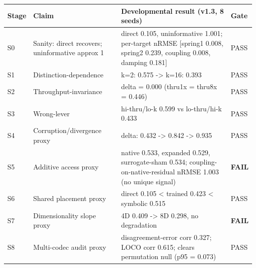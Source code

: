 \documentclass[
  11pt,
]{article}
\newcounter{none} %
\begin{document}
{\def\LTcaptype{none} %
\begin{longtable}[]{@{}
  >{\raggedright\arraybackslash}p{}
  >{\raggedright\arraybackslash}p{}
  >{\raggedright\arraybackslash}p{}
  >{\raggedright\arraybackslash}p{}@{}}
\toprule\noalign{}
\begin{minipage}[b]{\linewidth}\raggedright
Stage
\end{minipage} &
\begin{minipage}[b]{\linewidth}\raggedright
Claim
\end{minipage} &
\begin{minipage}[b]{\linewidth}\raggedright
Developmental result (v1.3, 8 seeds)
\end{minipage} &
\begin{minipage}[b]{\linewidth}\raggedright
Gate
\end{minipage} \\
\midrule\noalign{}
\endhead
\bottomrule\noalign{}
\endlastfoot
S0 & Sanity: direct recovers; uninformative approx 1 &
direct 0.105, uninformative 1.001; per-target nRMSE
{[}spring1 0.008, spring2 0.239, coupling 0.008,
damping 0.181{]} & PASS \\
S1 & Distinction-dependence & k=2: 0.575
-\textgreater{} k=16: 0.393 & PASS \\
S2 & Throughput-invariance & delta = 0.000 (thru1x =
thru8x = 0.446) & PASS \\
S3 & Wrong-lever & hi-thru/lo-k 0.599 vs lo-thru/hi-k
0.433 & PASS \\
S4 & Corruption/divergence proxy & delta: 0.432
-\textgreater{} 0.842 -\textgreater{} 0.935 & PASS \\
S5 & Additive access proxy & native 0.533, expanded
0.529, surrogate-sham 0.534;
coupling-on-native-residual nRMSE 1.003 (no unique
signal) & \textbf{FAIL} \\
S6 & Shared placement proxy & direct 0.105 \textless{}
trained 0.423 \textless{} symbolic 0.515 & PASS \\
S7 & Dimensionality slope proxy & 4D 0.409
-\textgreater{} 8D 0.298, no degradation &
\textbf{FAIL} \\
S8 & Multi-codec audit proxy & disagreement-error corr
0.327; LOCO corr 0.615; clears permutation null (p95 =
0.073) & PASS \\
\end{longtable}
}
\end{document}
